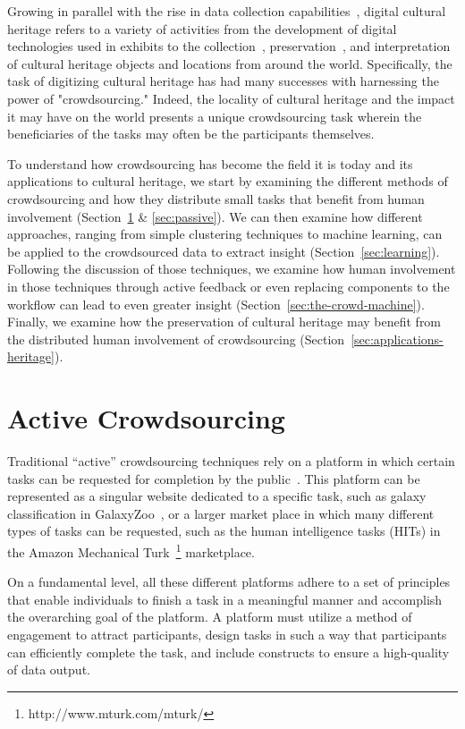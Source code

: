 \documentclass[10pt,twocolumn]{article}
\begin{document}
Growing in parallel with the rise in data collection 
capabilities~\cite{Crane2002}, digital cultural heritage refers to a variety of 
activities from the development of digital technologies used in exhibits to the 
collection~\cite{Proctor2010}, preservation~\cite{Chrons2011}, and 
interpretation of cultural heritage objects and locations from around the 
world. Specifically, the task of digitizing cultural heritage has had many 
successes with harnessing the power of "crowdsourcing." Indeed, the locality of 
cultural heritage and the impact it may have on the world presents a unique 
crowdsourcing task wherein the beneficiaries of the tasks may often be the 
participants themselves.

To understand how crowdsourcing has become the field it is today and its 
applications to cultural heritage, we start by examining the different methods 
of crowdsourcing and how they distribute small tasks that benefit from human 
involvement (Section~\ref{sec:active} \& \ref{sec:passive}). We can then 
examine how different approaches, ranging from simple clustering techniques to 
machine learning, can be applied to the crowdsourced data to extract insight 
(Section~\ref{sec:learning}). Following the discussion of those techniques, we 
examine how human involvement in those techniques through active feedback or 
even replacing components to the workflow can lead to even greater insight 
(Section~\ref{sec:the-crowd-machine}). Finally, we examine how the preservation 
of cultural heritage may benefit from the distributed human involvement of 
crowdsourcing (Section~\ref{sec:applications-heritage}).

\section{Active Crowdsourcing}
\label{sec:active}

Traditional ``active'' crowdsourcing techniques rely on a platform in which 
certain tasks can be requested for completion by the public~\cite{Howe2006}. 
This platform can be represented as a singular website dedicated to a specific 
task, such as galaxy classification in GalaxyZoo~\cite{Lintott2008}, or a 
larger market place in which many different types of tasks can be requested, 
such as the human intelligence tasks (HITs) in the Amazon Mechanical 
Turk~\footnote{http://www.mturk.com/mturk/} marketplace.

On a fundamental level, all these different platforms adhere to a set of
principles that enable individuals to finish a task in a meaningful manner and 
accomplish the overarching goal of the platform. A platform must utilize a 
method of engagement to attract participants, design tasks in such a way that 
participants can efficiently complete the task, and include constructs to 
ensure a high-quality of data output.
\end{document}
